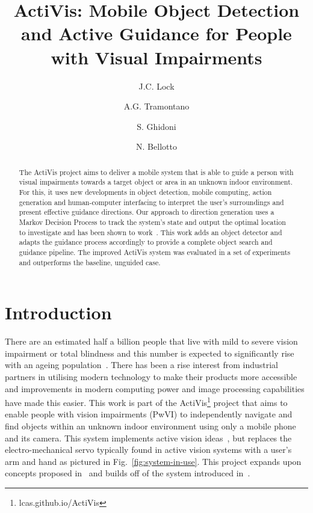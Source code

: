 \documentclass[runningheads]{llncs}
\begin{document}
\title{ActiVis: Mobile Object Detection and Active Guidance for People with Visual Impairments}

\author{J.C. Lock \and
  A.G. Tramontano \and
  S. Ghidoni \and
  N. Bellotto
}

\maketitle

\begin{abstract}
  The ActiVis project aims to deliver a mobile system that is able to guide a person with visual impairments towards a target object or area in an unknown indoor environment. 
  For this, it uses new developments in object detection, mobile computing, action generation and human-computer interfacing to interpret the user's surroundings and present effective guidance directions.
  Our approach to direction generation uses a Markov Decision Process to track the system's state and output the optimal location to investigate and has been shown to work~\cite{lock2019active}.
  This work adds an object detector and adapts the guidance process accordingly to provide a complete object search and guidance pipeline.
  The improved ActiVis system was evaluated in a set of experiments and outperforms the baseline, unguided case.
\end{abstract}

\section{Introduction}

There are an estimated half a billion people that live with mild to severe vision impairment or total blindness and this number is expected to significantly rise with an ageing population~\cite{bourne2017magnitude}.
There has been a rise interest from industrial partners in utilising modern technology to make their products more accessible and improvements in modern computing power and image processing capabilities have made this easier.
This work is part of the ActiVis\footnote{lcas.github.io/ActiVis} project that aims to enable people with vision impairments (PwVI) to independently navigate and find objects within an unknown indoor environment using only a mobile phone and its camera.
This system implements active vision ideas~\cite{bajcsy2017}, but replaces the electro-mechanical servo typically found in active vision systems with a user's arm and hand as pictured in Fig.~\ref{fig:system-in-use}.
This project expands upon concepts proposed in~\cite{bellotto2013,lock2017portable} and builds off of the system introduced in~\cite{lock2019active}.
\end{document}
